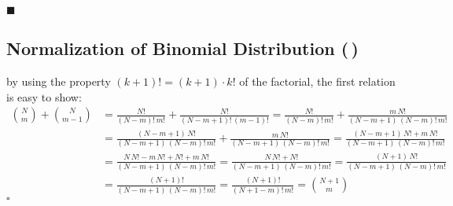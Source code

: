\documentclass[11pt, a4paper]{scrartcl}
\newcommand{\qed}{\hfill\(\square\)}
\newcommand{\eot}{\hfill\(\blacksquare\)}
\newcommand{\diffstar}{\texorpdfstring{\raisebox{-1pt}{\resizebox{!}{8pt}{\(\star\)}}}{*}}
\newcommand{\twostar}  {(\diffstar\,\diffstar)}
\begin{document}
			\eot

		\subsection{Normalization of Binomial Distribution  \twostar}
			by using the property \( (k + 1)! = (k + 1) \cdot k! \) of the factorial, the first relation is easy to show:
			\begin{equation}
				\begin{aligned}
					{ N \choose m } + { N \choose m - 1 }
						&= \frac{N!}{(N - m)! \, m!} + \frac{N!}{(N - m + 1)! \, (m - 1)!}
						 = \frac{N!}{(N - m)! \, m!} + \frac{m \, N!}{(N - m + 1) \, (N - m)! \, m!} \\
						&= \frac{(N - m + 1) \, N!}{(N - m + 1) \, (N - m)! \, m!} + \frac{m \, N!}{(N - m + 1) \, (N - m)! \, m!}
						 = \frac{(N - m + 1) \, N! + m \, N!}{(N - m + 1) \, (N - m)! \, m!} \\
						&= \frac{N \, N! - m \, N! + N! + m \, N!}{(N - m + 1) \, (N - m)! \, m!}
						 = \frac{N \, N! + N!}{(N - m + 1) \, (N - m)! \, m!}
						 = \frac{(N + 1) \, N!}{(N - m + 1) \, (N - m)! \, m!} \\
						&= \frac{(N + 1)!}{(N - m + 1) \, (N - m)! \, m!}
						 = \frac{(N + 1)!}{(N + 1 - m)! \, m!}
						 = { N + 1 \choose m }
				\end{aligned}
			\end{equation}
			\qed
\end{document}
